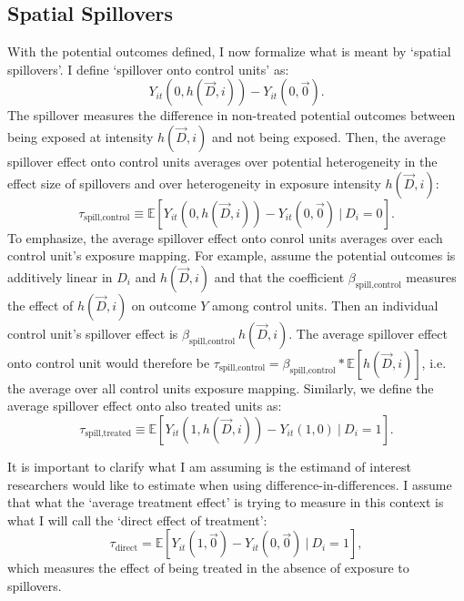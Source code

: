 \documentclass[11pt]{article}
\begin{document}
\subsection{Spatial Spillovers}

With the potential outcomes defined, I now formalize what is meant by `spatial spillovers'. I define `spillover onto control units' as: \[
    Y_{it}(0, h(\vec{D}, i)) - Y_{it}(0, \vec{0}).
\] 
The spillover measures the difference in non-treated potential outcomes between being exposed at intensity $h(\vec{D}, i)$ and not being exposed. Then, the average spillover effect onto control units averages over potential heterogeneity in the effect size of spillovers and over heterogeneity in exposure intensity $h(\vec{D}, i)$: \[
    \tau_{\text{spill,control}} \equiv \mathbb{E} \left[ Y_{it}(0, h(\vec{D}, i)) - Y_{it}(0, \vec{0}) \ \vert \ D_i = 0 \right].
\]
To emphasize, the average spillover effect onto conrol units averages over each control unit's exposure mapping. For example, assume the potential outcomes is additively linear in $D_i$ and $h(\vec{D}, i)$ and that the coefficient $\beta_{\text{spill,control}}$ measures the effect of $h(\vec{D}, i)$ on outcome $Y$ among control units. Then an individual control unit's spillover effect is $\beta_{\text{spill,control}} \ h(\vec{D}, i)$. The average spillover effect onto control unit would therefore be $\tau_{\text{spill,control}} = \beta_{\text{spill,control}} * \mathbb{E} \left[ h(\vec{D}, i)\right]$, i.e. the average over all control units exposure mapping. Similarly, we define the average spillover effect onto also treated units as: \[ 
    \tau_{\text{spill,treated}} \equiv \mathbb{E} \left[ Y_{it}(1, h(\vec{D}, i)) - Y_{it}(1, 0) \ \vert \ D_i = 1 \right].
\] 


It is important to clarify what I am assuming is the estimand of interest researchers would like to estimate when using difference-in-differences. I assume that what the `average treatment effect' is trying to measure in this context is what I will call the `direct effect of treatment': \[
    \tau_{\text{direct}} = \mathbb{E} \left[ Y_{it}(1, \vec{0}) - Y_{it}(0, \vec{0}) \ \vert \ D_i = 1 \right],
\] 
which measures the effect of being treated in the absence of exposure to spillovers. 
\end{document}
